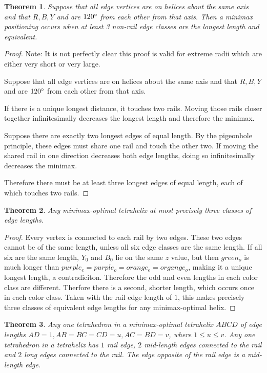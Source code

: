 \documentclass[11pt]{article}
\newtheorem{theorem}{Theorem}
\begin{document}
\begin{theorem}
  Suppose that all edge vertices are on helices about the same axis and that $R,B,Y$ and are $120\degree$ from each other from that axis.
  Then a minimax positioning occurs when at least 3 non-rail edge classes are the longest length and equivalent.
 \end{theorem}
\begin{proof}
Note: It is not perfectly clear this proof is valid for extreme radii which are either very short or very large.
  
   Suppose that all edge vertices are on helices about the same axis and that $R,B,Y$ and are $120\degree$ from each other from that axis.

  If there is a unique longest distance, it touches two rails. Moving those rails closer together infinitesimally decreases the longest length and
  therefore the minimax.

  Suppose there are exactly two longest edges of equal length. By the pigeonhole principle, these edges must share one rail and touch the other two.
  If moving the shared rail in one direction decreases both edge lengths, doing so infinitesimally decreases the minimax.

  Therefore there must be at least three longest edges of equal length, each of which touches two rails.
  \end{proof}

\begin{theorem}
  Any minimax-optimal tetrahelix at most precisely three classes of edge lengths.
\end{theorem}

\begin{proof}
  Every vertex is connected to each rail by two edges. These two edges cannot be of the same length, unless all six edge classes are the same
  length. If all six are the same length, $Y_0$ and $B_0$ lie on the same $z$ value, but then $green_o$ is much longer than $purple_e = purple_o = orange_e = organge_o$,
  making it a unique longest length, a contradiciton. Therefore the odd and even lengths in each color class are different. Therfore there is a second,
  shorter length, which occurs once in each color class. Taken with the rail edge length of $1$, this makes precisely three classes of equivalent
  edge lengths for any minimax-optimal helix.
\end{proof}
  
\begin{theorem}
  \label{tetrahelixoptimality}
  Any one tetrahedron in a minimax-optimal tetrahelix $ABCD$ of edge lengths $AD = 1, AB = BC = CD = u , AC = BD = v$, where $1 \leq u \leq v$.
  Any one tetrahedron in a tetrahelix has $1$ rail edge, $2$ mid-length edges connected to the rail and $2$ long edges connected to the rail.
  The edge opposite of the rail edge is a mid-length edge.
\end{theorem}
\end{document}
